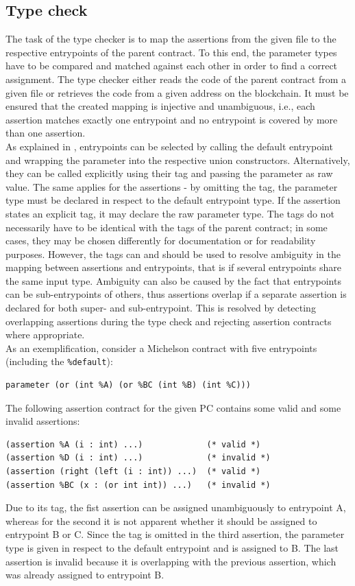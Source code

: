 \subsection{Type check}
The task of the type checker is to map the assertions from the given file to the respective entrypoints of the parent contract. To this end, the parameter types have to be compared and matched against each other in order to find a correct assignment. The type checker either reads the code of the parent contract from a given file or retrieves the code from a given address on the blockchain. It must be ensured that the created mapping is injective and unambiguous, i.e., each assertion matches exactly one entrypoint and no entrypoint is covered by more than one assertion.\\
As explained in , entrypoints can be selected by calling the default entrypoint and wrapping the parameter into the respective union constructors. Alternatively, they can be called explicitly using their tag and passing the parameter as raw value. The same applies for the assertions - by omitting the tag, the parameter type must be declared in respect to the default entrypoint type. If the assertion states an explicit tag, it may declare the raw parameter type. The tags do not necessarily have to be identical with the tags of the parent contract; in some cases, they may be chosen differently for documentation or for readability purposes. However, the tags can and should be used to resolve ambiguity in the mapping between assertions and entrypoints, that is if several entrypoints share the same input type. Ambiguity can also be caused by the fact that entrypoints can be sub-entrypoints of others, thus assertions overlap if a separate assertion is declared for both super- and sub-entrypoint. This is resolved by detecting overlapping assertions during the type check and rejecting assertion contracts where appropriate. \\
As an exemplification, consider a Michelson contract with five entrypoints (including the \texttt{\%default}):
\begin{lstlisting}[numbers=none, language=Michelson]
parameter (or (int %A) (or %BC (int %B) (int %C)))
\end{lstlisting}
The following assertion contract for the given PC contains some valid and some invalid assertions:
\begin{lstlisting}[language=Assertion]
(assertion %A (i : int) ...)             (* valid *)
(assertion %D (i : int) ...)             (* invalid *)
(assertion (right (left (i : int)) ...)  (* valid *)
(assertion %BC (x : (or int int)) ...)   (* invalid *)
\end{lstlisting}
Due to its tag, the fist assertion can be assigned unambiguously to entrypoint A, whereas for the second it is not apparent whether it should be assigned to entrypoint B or C. Since the tag is omitted in the third assertion, the parameter type is given in respect to the default entrypoint and is assigned to B. The last assertion is invalid because it is overlapping with the previous assertion, which was already assigned to entrypoint B.

